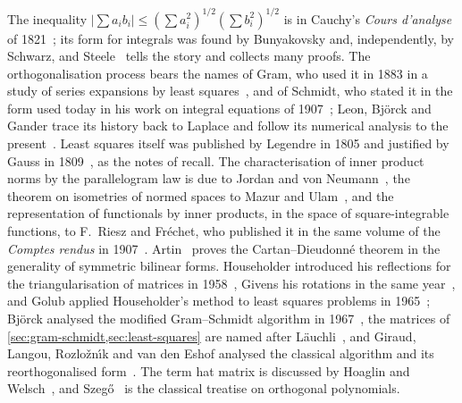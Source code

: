 The inequality $|\sum a_ib_i|\le(\sum a_i^2)^{1/2}(\sum b_i^2)^{1/2}$ is in Cauchy's \emph{Cours d'analyse} of 1821~\cite{cauchy1821}; its form for integrals was found by Bunyakovsky and, independently, by Schwarz, and Steele~\cite{steele2004} tells the story and collects many proofs. The orthogonalisation process bears the names of Gram, who used it in 1883 in a study of series expansions by least squares~\cite{gram1883}, and of Schmidt, who stated it in the form used today in his work on integral equations of 1907~\cite{schmidt1907}; Leon, Bj\"orck and Gander trace its history back to Laplace and follow its numerical analysis to the present~\cite{leon2013}. Least squares itself was published by Legendre in 1805 and justified by Gauss in 1809~\cite{legendre1805,gauss1809,stigler1981}, as the notes of  recall. The characterisation of inner product norms by the parallelogram law is due to Jordan and von Neumann~\cite{jordanvonneumann1935}, the theorem on isometries of normed spaces to Mazur and Ulam~\cite{mazur1932}, and the representation of functionals by inner products, in the space of square-integrable functions, to F.~Riesz and Fr\'echet, who published it in the same volume of the \emph{Comptes rendus} in 1907~\cite{riesz1907,frechet1907}. Artin~\cite{artin1957geometric} proves the Cartan--Dieudonn\'e theorem in the generality of symmetric bilinear forms. Householder introduced his reflections for the triangularisation of matrices in 1958~\cite{householder1958}, Givens his rotations in the same year~\cite{givens1958}, and Golub applied Householder's method to least squares problems in 1965~\cite{golub1965}; Bj\"orck analysed the modified Gram--Schmidt algorithm in 1967~\cite{bjorck1967}, the matrices of \cref{sec:gram-schmidt,sec:least-squares} are named after L\"auchli~\cite{lauchli1961}, and Giraud, Langou, Rozlo\v{z}n\'{\i}k and van den Eshof analysed the classical algorithm and its reorthogonalised form~\cite{giraud2005numer,giraud2005camwa}. The term hat matrix is discussed by Hoaglin and Welsch~\cite{hoaglin1978}, and Szeg\H{o}~\cite{szego1975} is the classical treatise on orthogonal polynomials.

